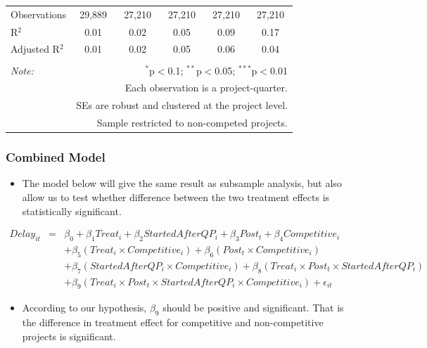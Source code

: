 \documentclass[
]{article}
\providecommand{\tightlist}{%
  \setlength{\itemsep}{0pt}\setlength{\parskip}{0pt}}
\begin{document}
\begin{table}[H]
\begin{tabular}{@{\extracolsep{-2pt}}lccccc}
Observations & 29,889 & 27,210 & 27,210 & 27,210 & 27,210 \\ 
R$^{2}$ & 0.01 & 0.02 & 0.05 & 0.09 & 0.17 \\ 
Adjusted R$^{2}$ & 0.01 & 0.02 & 0.05 & 0.06 & 0.04 \\ 
\hline 
\hline \\[-1.8ex] 
\textit{Note:}  & \multicolumn{5}{r}{$^{*}$p$<$0.1; $^{**}$p$<$0.05; $^{***}$p$<$0.01} \\ 
 & \multicolumn{5}{r}{Each observation is a project-quarter.} \\ 
 & \multicolumn{5}{r}{SEs are robust and clustered at the project level.} \\ 
 & \multicolumn{5}{r}{Sample restricted to non-competed projects.} \\ 
\end{tabular} 
\end{table}

\hypertarget{combined-model}{%
\subsubsection{Combined Model}\label{combined-model}}

\begin{itemize}
\tightlist
\item
  The model below will give the same result as subsample analysis, but
  also allow us to test whether difference between the two treatment
  effects is statistically significant.
\end{itemize}

\[ \begin{aligned} Delay_{it} &=& \beta_0 +\beta_1 Treat_i+ \beta_2 StartedAfterQP_i+ \beta_3 Post_t+ \beta_4 Competitive_i\\ && + \beta_5 (Treat_i \times Competitive_i) + \beta_6 (Post_t \times Competitive_i) \\ && +\beta_7 (StartedAfterQP_i \times Competitive_i)+\beta_8 (Treat_i \times Post_t \times StartedAfterQP_i )\\ && +\beta_9 (Treat_i \times Post_t \times StartedAfterQP_i \times Competitive_i) + \epsilon_{it} \end{aligned} \]

\begin{itemize}
\tightlist
\item
  According to our hypothesis, \(\beta_9\) should be positive and
  significant. That is the difference in treatment effect for
  competitive and non-competitive projects is significant.
\end{itemize}
\end{document}
